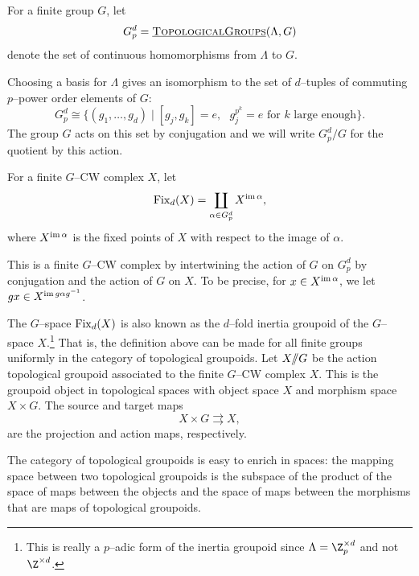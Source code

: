 
\begin{definition}
For a finite group \(G\), let
\[
G_{p}^{d} = \operatorname{\underline{\smash{\normalfont\textsc{TopologicalGroups}}}}(\Lambda,G)
\]
denote the set of continuous homomorphisms from \(\Lambda\) to \(G\).
\end{definition}

Choosing a basis for \(\Lambda\) gives an isomorphism to the set of \(d\)--tuples of commuting \(p\)--power order elements of \(G\):
\[
G_{p}^{d} \cong \{(g_1,\ldots, g_d) \mid [g_j,g_k] = e, \text{ } g_{j}^{p^k}=e \text{ for } k \text{ large enough}\}.
\]
The group \(G\) acts on this set by conjugation and we will write \(G_{p}^{d}/G\) for the quotient by this action.

\begin{definition} \label{fix}
For a finite \(G\)--CW complex \(X\), let
\[
\operatorname{Fix}_d(X) = \coprod_{\alpha \in G_{p}^{d}} X^{\operatorname{im} \alpha},
\]
where \(X^{\operatorname{im} \alpha}\) is the fixed points of \(X\) with respect to the image of \(\alpha\).
\end{definition}

This is a finite \(G\)--CW complex by intertwining the action of \(G\) on \(G_{p}^{d}\) by conjugation and the action of \(G\) on \(X\).
To be precise, for \(x \in X^{\operatorname{im} \alpha}\), we let \(gx \in X^{\operatorname{im} g \alpha g^{-1}}\).

The \(G\)--space \(\operatorname{Fix}_d(X)\) is also known as the \(d\)--fold inertia groupoid of the \(G\)--space \(X\).\footnote{This is really a \(p\)--adic form of the inertia groupoid since \(\Lambda = \Z_{p}^{\times d}\) and not \(\Z^{\times d}\).} That is, the definition above can be made for all finite groups uniformly in the category of topological groupoids.
Let \(X /\!\!/ G\) be the action topological groupoid associated to the finite \(G\)--CW complex \(X\).
This is the groupoid object in topological spaces with object space \(X\) and morphism space \(X \times G\).
The source and target maps
\[
X \times G \rightrightarrows X,
\]
are the projection and action maps, respectively.


The category of topological groupoids is easy to enrich in spaces: the mapping space between two topological groupoids is the subspace of the product of the space of maps between the objects and the space of maps between the morphisms that are maps of topological groupoids. 

